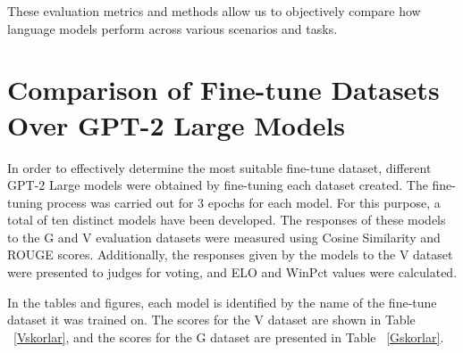 \documentclass[conference]{IEEEtran}
\begin{document}
These evaluation metrics and methods allow us to objectively compare how language models perform across various scenarios and tasks.

\section{Comparison of Fine-tune Datasets Over GPT-2 Large Models}

In order to effectively determine the most suitable fine-tune dataset, different GPT-2 Large models were obtained by fine-tuning each dataset created. The fine-tuning process was carried out for 3 epochs for each model. For this purpose, a total of ten distinct models have been developed. The responses of these models to the G and V evaluation datasets were measured using Cosine Similarity and ROUGE scores. Additionally, the responses given by the models to the V dataset were presented to judges for voting, and ELO and WinPct values were calculated.

In the tables and figures, each model is identified by the name of the fine-tune dataset it was trained on. The scores for the V dataset are shown in Table ~\ref{Vskorlar}, and the scores for the G dataset are presented in Table ~\ref{Gskorlar}. 




\end{document}
